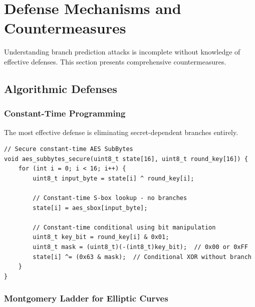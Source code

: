 \documentclass[11pt,a4paper]{article}
\theoremstyle{definition}
\begin{document}
\section{Defense Mechanisms and Countermeasures}

Understanding branch prediction attacks is incomplete without knowledge of effective defenses. This section presents comprehensive countermeasures.

\subsection{Algorithmic Defenses}

\subsubsection{Constant-Time Programming}

The most effective defense is eliminating secret-dependent branches entirely.

\begin{lstlisting}[caption={Constant-Time AES SubBytes Implementation}]
// Secure constant-time AES SubBytes
void aes_subbytes_secure(uint8_t state[16], uint8_t round_key[16]) {
    for (int i = 0; i < 16; i++) {
        uint8_t input_byte = state[i] ^ round_key[i];
        
        // Constant-time S-box lookup - no branches
        state[i] = aes_sbox[input_byte];
        
        // Constant-time conditional using bit manipulation
        uint8_t key_bit = round_key[i] & 0x01;
        uint8_t mask = (uint8_t)(-(int8_t)key_bit);  // 0x00 or 0xFF
        state[i] ^= (0x63 & mask);  // Conditional XOR without branch
    }
}
\end{lstlisting}

\subsubsection{Montgomery Ladder for Elliptic Curves}
\end{document}
